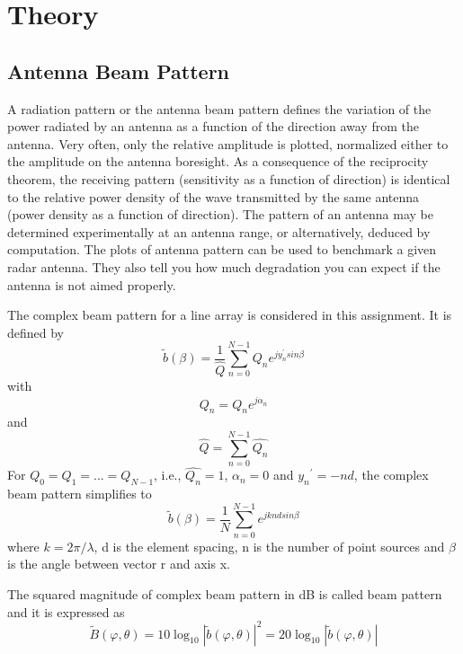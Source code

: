 \chapter*{Theory}

\section{ Antenna Beam Pattern } \label{ Antenna Beam Pattern }
\noindent A radiation pattern or the antenna beam pattern defines the variation of the power radiated by an antenna as a function of the direction away from the antenna. Very often, only the relative amplitude is plotted, normalized either to the amplitude on the antenna boresight. As a consequence of the reciprocity theorem, the receiving pattern (sensitivity as a function of direction) is identical to the relative power density of the wave transmitted by the same antenna (power density as a function of direction). The pattern of an antenna may be determined experimentally at an antenna range, or alternatively, deduced by computation. The plots of antenna pattern can be used to benchmark a given radar antenna. They also tell you how much degradation you can expect if the antenna is not aimed properly.

\noindent The complex beam pattern for a line array is considered in this assignment. It is defined by
\begin{equation*}
 \tilde{b}(\beta) = \frac{1}{\hat{Q}} \sum_{n=0}^{N-1}Q_{n} e^{j{y_{n}^{'}} sin\beta}
 \end{equation*}
 \noindent with
  \begin{equation*}
 Q_{n} = \hat{Q_{n}} e^{j \alpha_{n}}
 \end{equation*}
 \noindent and
  \begin{equation*}
 \hat{Q} = \sum_{n=0}^{N-1}\hat{Q_{n}}
 \end{equation*}
\noindent For $Q_{0} = Q_{1} = ... = Q_{N-1}$, i.e., $\hat{Q_n} = 1$, $\alpha_n = 0$ and ${y_n}^{'} = -nd$, the complex beam pattern simplifies to
 \begin{equation*}
 \tilde{b}(\beta) = \frac{1}{N} \sum_{n=0}^{N-1} e^{jknd sin\beta}
 \end{equation*}
 \noindent where $k = 2\pi/\lambda$, d is the element spacing, n is the number of point sources and $\beta$ is the angle between vector r and axis x.
 
 \noindent The squared magnitude of complex beam pattern in dB is called beam pattern and it is expressed as
 \begin{equation*}
 \tilde{B}(\varphi,\theta) = 10\log_{10}{{|\tilde{b}(\varphi,\theta)|^{2}}} = 20\log_{10}{|\tilde{b}(\varphi,\theta)|}
  \end{equation*}

